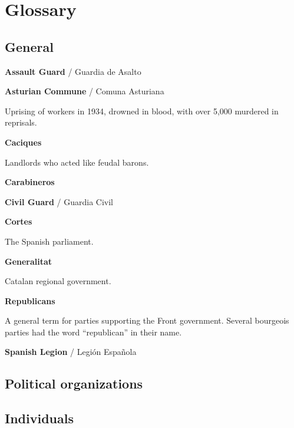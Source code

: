 \chapter{Glossary}

\section{General}

\begin{multicols}{2}
  \RaggedRight
  \setlength{\parskip}{0.25\baselineskip}

\textbf{Assault Guard} / Guardia de Asalto

\bigskip

\textbf{Asturian Commune} / Comuna Asturiana

Uprising of workers in 1934, drowned in blood, with over 5,000 murdered in reprisals.

\bigskip

\textbf{Caciques}

Landlords who acted like feudal barons.

\bigskip

\textbf{Carabineros}

\bigskip

\textbf{Civil Guard} / Guardia Civil

\bigskip

\textbf{Cortes}

The Spanish parliament.

\bigskip

\textbf{Generalitat}

Catalan regional government.

\bigskip

\textbf{Republicans}

A general term for parties supporting the Front government. Several bourgeois parties had the word “republican” in their name.

\bigskip

\textbf{Spanish Legion} / Legión Española

\end{multicols}

\section{Political organizations}

\section{Individuals}

